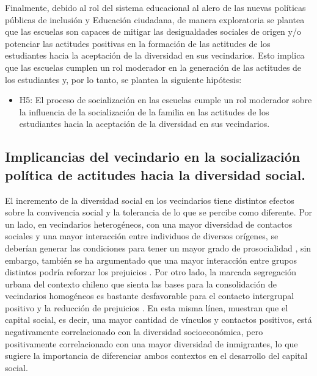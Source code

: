 \documentclass[12pt,twoside]{templates/facsothesis}
\providecommand{\tightlist}{%
  \setlength{\itemsep}{0pt}\setlength{\parskip}{0pt}}
\begin{document}
Finalmente, debido al rol del sistema educacional al alero de las nuevas políticas públicas de inclusión y Educación ciudadana, de manera exploratoria se plantea que las escuelas son capaces de mitigar las desigualdades sociales de origen y/o potenciar las actitudes positivas en la formación de las actitudes de los estudiantes hacia la aceptación de la diversidad en sus vecindarios. Esto implica que las escuelas cumplen un rol moderador en la generación de las actitudes de los estudiantes y, por lo tanto, se plantea la siguiente hipótesis:

\begin{itemize}
\tightlist
\item
  H5: El proceso de socialización en las escuelas cumple un rol moderador sobre la influencia de la socialización de la familia en las actitudes de los estudiantes hacia la aceptación de la diversidad en sus vecindarios.
\end{itemize}

\hypertarget{implicancias-del-vecindario-en-la-socializaciuxf3n-poluxedtica-de-actitudes-hacia-la-diversidad-social.}{%
\subsection{Implicancias del vecindario en la socialización política de actitudes hacia la diversidad social.}\label{implicancias-del-vecindario-en-la-socializaciuxf3n-poluxedtica-de-actitudes-hacia-la-diversidad-social.}}

El incremento de la diversidad social en los vecindarios tiene distintos efectos sobre la convivencia social y la tolerancia de lo que se percibe como diferente. Por un lado, en vecindarios heterogéneos, con una mayor diversidad de contactos sociales y una mayor interacción entre individuos de diversos orígenes, se deberían generar las condiciones para tener un mayor grado de prosocialidad \citep{diprete_segregation_2011}, sin embargo, también se ha argumentado que una mayor interacción entre grupos distintos podría reforzar los prejuicios \citep{putnam_pluribus_2007}. Por otro lado, la marcada segregación urbana del contexto chileno que sienta las bases para la consolidación de vecindarios homogéneos es bastante desfavorable para el contacto intergrupal positivo y la reducción de prejuicios \citep{garreton_city_2017}. En esta misma línea, \citet{garreton_social_2021} muestran que el capital social, es decir, una mayor cantidad de vínculos y contactos positivos, está negativamente correlacionado con la diversidad socioeconómica, pero positivamente correlacionado con una mayor diversidad de inmigrantes, lo que sugiere la importancia de diferenciar ambos contextos en el desarrollo del capital social.
\end{document}
